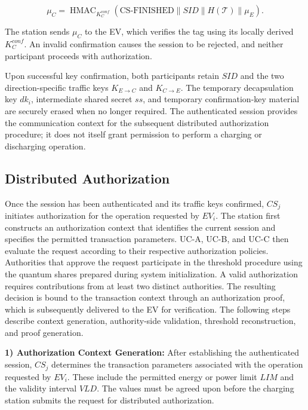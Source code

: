 \documentclass[twocolumn,10pt,journal]{IEEEtran}
\begin{document}
\begin{equation}
\mu_C=
\operatorname{HMAC}_{K_C^{conf}}
\left(
\mathrm{CS\mbox{-}FINISHED}
\parallel SID\parallel H(\mathcal{T})
\parallel\mu_E
\right).
\label{eq:qsv2g_cs_finished}
\end{equation}

The station sends $\mu_C$ to the EV, which
verifies the tag using its locally derived
$K_C^{conf}$. An invalid confirmation causes
the session to be rejected, and neither
participant proceeds with authorization.

Upon successful key confirmation, both
participants retain $SID$ and the two direction-specific
traffic keys $K_{E\to C}$ and $K_{C\to E}$.
The temporary decapsulation key $dk_i$,
intermediate shared secret $ss$, and
temporary confirmation-key material are
securely erased when no longer required.
The authenticated session provides the
communication context for the subsequent
distributed authorization procedure; it
does not itself grant permission to perform
a charging or discharging operation.

\subsection{Distributed Authorization}

Once the session has been authenticated and its traffic keys confirmed,
$CS_j$ initiates authorization for the operation requested
by $EV_i$. The station first constructs an authorization
context that identifies the current session and specifies
the permitted transaction parameters. UC-A, UC-B, and UC-C
then evaluate the request according to their respective
authorization policies. Authorities that approve the
request participate in the threshold procedure using the
quantum shares prepared during system initialization.
A valid authorization requires contributions from at
least two distinct authorities. The resulting decision
is bound to the transaction context through an
authorization proof, which is subsequently delivered
to the EV for verification. The following steps describe
context generation, authority-side validation,
threshold reconstruction, and proof generation.

\noindent\textbf{1) Authorization Context Generation:}
After establishing the authenticated session, $CS_j$
determines the transaction parameters associated with
the operation requested by $EV_i$. These include the
permitted energy or power limit $LIM$ and the validity
interval $VLD$. The values must be agreed upon before
the charging station submits the request for distributed
authorization.
\end{document}
